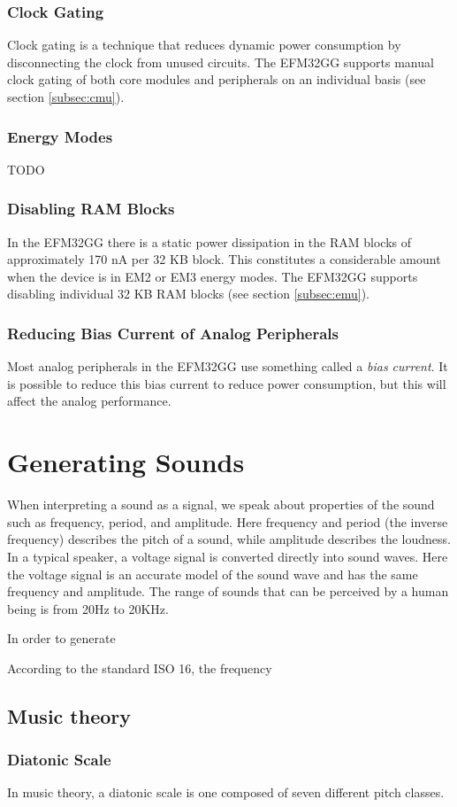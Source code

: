 \subsubsection{Clock Gating}
Clock gating is a technique that reduces dynamic power consumption by disconnecting the clock from unused circuits. The EFM32GG supports manual clock gating of both core modules and peripherals on an individual basis (see section \ref{subsec:cmu}).\cite{efm32-energy-optimization} 

\subsubsection{Energy Modes}
TODO %

\subsubsection{Disabling RAM Blocks}
In the EFM32GG there is a static power dissipation in the RAM blocks of approximately 170 nA per 32 KB block. This constitutes a considerable amount when the device is in EM2 or EM3 energy modes. The EFM32GG supports disabling individual 32 KB RAM blocks (see section \ref{subsec:emu}).\cite{efm32-energy-optimization}

\subsubsection{Reducing Bias Current of Analog Peripherals}
Most analog peripherals in the EFM32GG use something called a \emph{bias current}. It is possible to reduce this bias current to reduce power consumption, but this will affect the analog performance.\cite{efm32-energy-optimization}



\section{Generating Sounds}
When interpreting a sound as a signal, we speak about properties of the sound such as frequency, period, and amplitude. Here frequency and period (the inverse frequency) describes the pitch of a sound, while amplitude describes the loudness. In a typical speaker, a voltage signal is converted directly into sound waves. Here the voltage signal is an accurate model of the sound wave and has the same frequency and amplitude. The range of sounds that can be perceived by a human being is from 20Hz to 20KHz.\cite{compendium}

In order to generate 

According to the standard ISO 16, the frequency 


\subsection{Music theory}

\subsubsection{Diatonic Scale}
In music theory, a diatonic scale is one composed of seven different pitch classes.
